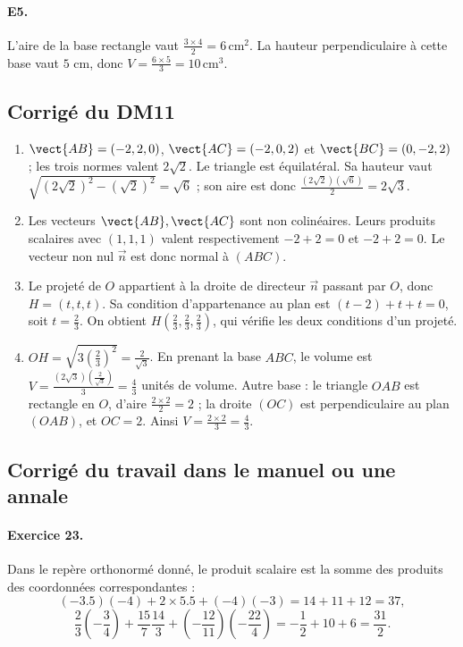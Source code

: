 \paragraph{E5.}L'aire de la base rectangle vaut $\frac{3\times4}{2}=6\,\mathrm{cm}^2$. La hauteur perpendiculaire à cette base vaut $5$ cm, donc $V=\frac{6\times5}{3}=10\,\mathrm{cm}^3$.

\subsection{Corrigé du DM11}\begin{enumerate}
\item $\vect{AB}=(-2,2,0)$, $\vect{AC}=(-2,0,2)$ et $\vect{BC}=(0,-2,2)$ ; les trois normes valent $2\sqrt2$. Le triangle est équilatéral. Sa hauteur vaut $\sqrt{(2\sqrt2)^2-(\sqrt2)^2}=\sqrt6$ ; son aire est donc $\frac{(2\sqrt2)(\sqrt6)}{2}=2\sqrt{3}$.
\item Les vecteurs $\vect{AB},\vect{AC}$ sont non colinéaires. Leurs produits scalaires avec $(1,1,1)$ valent respectivement $-2+2=0$ et $-2+2=0$. Le vecteur non nul $\vec n$ est donc normal à $(ABC)$.
\item Le projeté de $O$ appartient à la droite de directeur $\vec n$ passant par $O$, donc $H=(t,t,t)$. Sa condition d'appartenance au plan est $(t-2)+t+t=0$, soit $t=\frac{2}{3}$. On obtient $H(\frac{2}{3},\frac{2}{3},\frac{2}{3})$, qui vérifie les deux conditions d'un projeté.
\item $OH=\sqrt{3(\frac{2}{3})^2}=\frac{2}{\sqrt{3}}$. En prenant la base $ABC$, le volume est $V=\frac{(2\sqrt3)(\frac{2}{\sqrt{3}})}{3}=\frac{4}{3}$ unités de volume. Autre base : le triangle $OAB$ est rectangle en $O$, d'aire $\frac{2\times2}{2}=2$ ; la droite $(OC)$ est perpendiculaire au plan $(OAB)$, et $OC=2$. Ainsi $V=\frac{2\times2}{3}=\frac{4}{3}$.
\end{enumerate}

\subsection{Corrigé du travail dans le manuel ou une annale}\paragraph{Exercice 23.} Dans le repère orthonormé donné, le produit scalaire est la somme des produits des coordonnées correspondantes :
\[(-\num{3,5})(-4)+2\times\num{5,5}+(-4)(-3)=14+11+12=37,\]
\[\frac23\left(-\frac34\right)+\frac{15}7\frac{14}3+\left(-\frac{12}{11}\right)\left(-\frac{22}4\right)=-\frac12+10+6=\frac{31}2.\]
